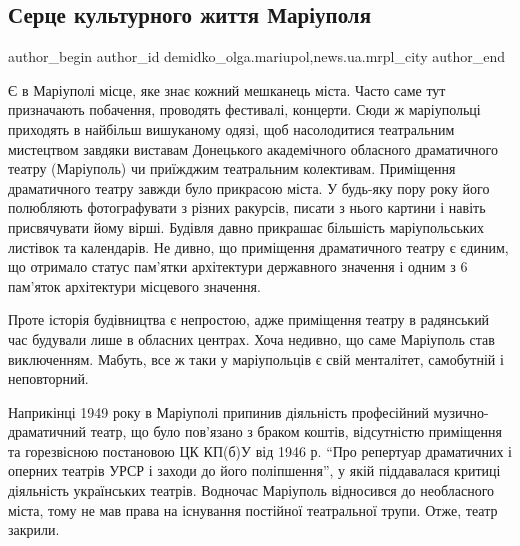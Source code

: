  
 
 
 
 
 
\subsection{Серце культурного життя Маріуполя}
\label{sec:09_10_2017.stz.news.ua.mrpl_city.1.serce_kulturnogo_zhyttja_mariupolja}
 
\ifcmt
 author_begin
   author_id demidko_olga.mariupol,news.ua.mrpl_city
 author_end
\fi

Є в Маріуполі місце, яке знає кожний мешканець міста. Часто саме тут
призначають побачення, проводять фестивалі, концерти. Сюди ж маріупольці
приходять в найбільш вишуканому одязі, щоб насолодитися театральним мистецтвом
завдяки виставам Донецького академічного обласного драматичного театру
(Маріуполь) чи приїжджим театральним колективам. Приміщення драматичного
театру завжди було прикрасою міста. У будь-яку пору року його полюбляють
фотографувати з різних ракурсів, писати з нього картини і навіть присвячувати
йому вірші. Будівля давно прикрашає більшість маріупольських листівок та
календарів. Не дивно, що приміщення драматичного театру є єдиним, що отримало
статус пам'ятки архітектури державного значення і одним з 6 пам'яток
архітектури місцевого значення.

Проте історія будівництва є непростою, адже приміщення театру в радянський час
будували лише в обласних центрах. Хоча недивно, що саме Маріуполь став
виключенням. Мабуть, все ж таки у маріупольців є свій менталітет, самобутній і
неповторний.

Наприкінці 1949 року в Маріуполі припинив діяльність професійний
музично-драматичний театр, що було пов'язано з браком коштів, відсутністю
приміщення та горезвісною постановою ЦК КП(б)У від 1946 р. \enquote{Про репертуар
драматичних і оперних театрів УРСР і заходи до його поліпшення}, у якій
піддавалася критиці діяльність українських театрів. Водночас Маріуполь
відносився до необласного міста, тому не мав права на існування постійної
театральної трупи. Отже, театр закрили.

